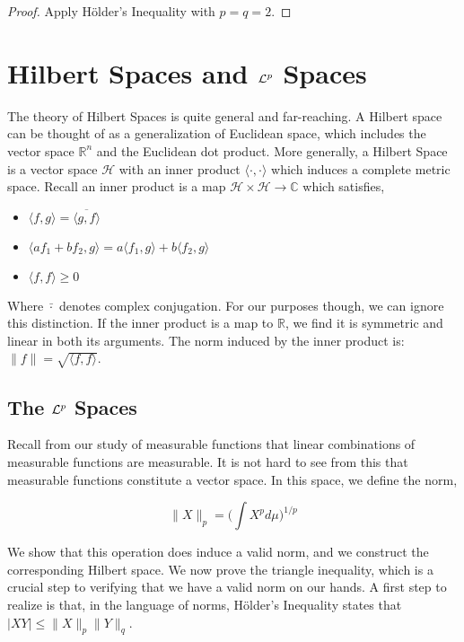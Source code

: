     \begin{proof}
        Apply Hölder's Inequality with $p = q = 2$.
    \end{proof}

    \section{Hilbert Spaces and $\mathcal L^p$ Spaces}

    The theory of Hilbert Spaces is quite general and far-reaching. A Hilbert space can 
    be thought of as a generalization of Euclidean space, which includes the vector space 
    $\mathbb R^n$ and the Euclidean dot product. More generally, a Hilbert Space is a vector 
    space $\mathcal H$ with an inner product $\langle \cdot , \cdot \rangle$ which induces a 
    complete metric space. Recall an inner product is a map $\mathcal H \times \mathcal H \to \mathbb C$ which 
    satisfies, 

    \begin{itemize}
        \item $\langle f, g \rangle = \overline{\langle g,f \rangle}$
        \item $\langle af_1 + bf_2, g \rangle = a \langle f_1, g \rangle + b \langle f_2, g \rangle$
        \item $\langle f, f \rangle \geq 0$
    \end{itemize}

    Where $\bar{\cdot}$ denotes complex conjugation. For our purposes though, we can ignore 
    this distinction. If the inner product is a map to $\mathbb R$, we find it is symmetric and linear 
    in both its arguments. The norm induced by the inner product is: $\|f\| = \sqrt{\langle f,f \rangle}$. 

    \subsection{The $\mathcal L^p$ Spaces}

    Recall from our study of 
    measurable functions that linear combinations of measurable functions 
    are measurable. It is not hard to see from this that measurable functions constitute 
    a vector space. In this space, we define the norm,

    \[ \|X\|_p = \bigg(\int X^p d\mu \bigg)^{1/p} \]

    We show that this operation does induce a valid norm, and we construct the corresponding 
    Hilbert space. We now prove the triangle inequality, which is a crucial step to verifying that 
    we have a valid norm on our hands. A first step to realize is that, 
    in the language of norms, Hölder's Inequality states that $|XY| \leq \|X\|_p\|Y\|_q$.

